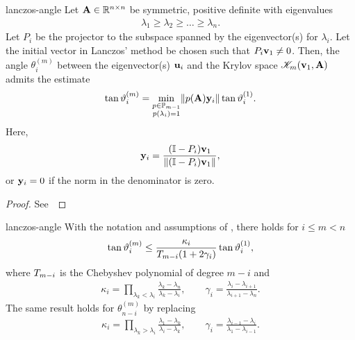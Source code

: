 \begin{Lemma}{lanczos-angle}
  Let $\mathbf A\in\mathbb R^{n\times n}$ be symmetric, positive definite with eigenvalues
  \begin{gather}
    \lambda_1 \ge \lambda_2 \ge \dots \ge \lambda_n.
  \end{gather}
  Let $P_i$ be the projector to the subspace spanned by the
  eigenvector(s) for $\lambda_i$. Let the initial vector in Lanczos'
  method be chosen such that $P_i \mathbf v_1\neq 0$. Then, the angle
  $\theta_i^{(m)}$ between the eigenvector(s) $\mathbf u_i$ and the Krylov space
  $\mathscr K_m(\mathbf v_1,\mathbf A)$ admits the estimate
  \begin{gather}
    \tan\vartheta_i^{(m)} = \min_{\substack{p\in\mathbb P_{m-1}\\p(\lambda_i)=1}} \lVert p(\mathbf A)\mathbf y_i\rVert \tan \vartheta_i^{(1)}.
  \end{gather}
  Here,
  \begin{gather}
    \mathbf y_i = \frac{(\mathbb I-P_i)\mathbf v_1}{\lVert(\mathbb I-P_i)\mathbf v_1\rVert},
  \end{gather}
  or $\mathbf y_i=0$ if the norm in the denominator is zero.
\end{Lemma}

\begin{proof}
  See~\cite[Lemma 6.1]{Saad11}
\end{proof}

\begin{Theorem}{lanczos-angle}
  With the notation and assumptions of , there holds for $i\le m < n$
  \begin{gather}
    \tan\vartheta_i^{(m)} \le \frac{\kappa_i}{T_{m-i}(1+2\gamma_i)}\tan\vartheta_i^{(1)},
  \end{gather}
  where $T_{m-i}$ is the Chebyshev polynomial of degree $m-i$ and
  \begin{gather}
    \kappa_i=\prod_{\lambda_k < \lambda_i} \frac{\lambda_k-\lambda_n}{\lambda_k-\lambda_i},
    \qquad \gamma_i = \frac{\lambda_{i}-\lambda_{i+1}}{\lambda_{i+1}-\lambda_{n}}.
  \end{gather}
  The same result holds for $\theta_{n-i}^{(m)}$ by replacing
  \begin{gather}
    \kappa_i=\prod_{\lambda_k > \lambda_i} \frac{\lambda_1-\lambda_k}{\lambda_i-\lambda_k},
    \qquad \gamma_i = \frac{\lambda_{i-1}-\lambda_{i}}{\lambda_{1}-\lambda_{i-1}}.
  \end{gather}  
\end{Theorem}

